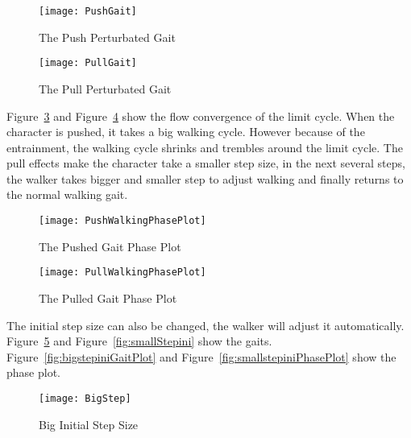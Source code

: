 \begin{figure}[!htbp]
  \begin{center}
      \texttt{[image: PushGait]}
    \caption{The Push Perturbated Gait}
    \label{fig:PushGait}
\end{center}
\end{figure}


\begin{figure}[!htbp]
  \begin{center}
      \texttt{[image: PullGait]}
    \caption{The Pull Perturbated Gait}
    \label{fig:PullGait}
\end{center}
\end{figure}

Figure~\ref{fig:PushGaitPlot} and Figure~\ref{fig:PullGaitPhasePlot} show the flow convergence of the limit cycle.
When the character is pushed, it takes a big walking cycle. 
However because of the entrainment, the walking cycle shrinks and trembles around the limit cycle. 
The pull effects make the character take a smaller step size, in the next several steps, the walker takes bigger and smaller step to adjust walking and finally returns to the normal walking gait.


\begin{figure}[!htbp]
  \begin{center}
      \texttt{[image: PushWalkingPhasePlot]}
    \caption{The Pushed Gait Phase Plot}
    \label{fig:PushGaitPlot}
\end{center}
\end{figure}


\begin{figure}[!htbp]
  \begin{center}
      \texttt{[image: PullWalkingPhasePlot]}
    \caption{The Pulled Gait Phase Plot}
    \label{fig:PullGaitPhasePlot}
\end{center}
\end{figure}


The initial step size can also be changed, the walker will adjust it automatically.
Figure~\ref{fig:bigStepIni} and Figure~\ref{fig:smallStepini} show the gaits.
Figure~\ref{fig:bigstepiniGaitPlot} and Figure~\ref{fig:smallstepiniPhasePlot} show the phase plot.

\begin{figure}[!htbp]
  \begin{center}
      \texttt{[image: BigStep]}
    \caption{Big Initial Step Size}
    \label{fig:bigStepIni}
\end{center}
\end{figure}


